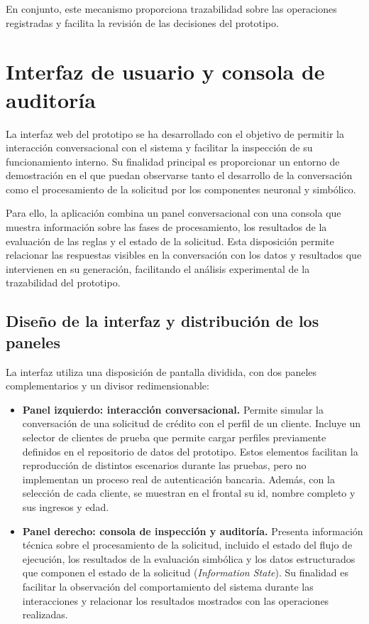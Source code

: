 \documentclass[12pt,a4paper]{report}
\begin{document}
En conjunto, este mecanismo proporciona trazabilidad sobre las operaciones registradas y facilita la revisión de las decisiones del prototipo.

\section{Interfaz de usuario y consola de auditoría}

La interfaz web del prototipo se ha desarrollado con el objetivo de permitir la interacción conversacional con el sistema y facilitar la inspección de su funcionamiento interno. Su finalidad principal es proporcionar un entorno de demostración en el que puedan observarse tanto el desarrollo de la conversación como el procesamiento de la solicitud por los componentes neuronal y simbólico.

Para ello, la aplicación combina un panel conversacional con una consola que muestra información sobre las fases de procesamiento, los resultados de la evaluación de las reglas y el estado de la solicitud. Esta disposición permite relacionar las respuestas visibles en la conversación con los datos y resultados que intervienen en su generación, facilitando el análisis experimental de la trazabilidad del prototipo.

\subsection{Diseño de la interfaz y distribución de los paneles}

La interfaz utiliza una disposición de pantalla dividida, con dos paneles complementarios y un divisor redimensionable:

\begin{itemize}
    \item \textbf{Panel izquierdo: interacción conversacional.} Permite simular la conversación de una solicitud de crédito con el perfil de un cliente. Incluye un selector de clientes de prueba que permite cargar perfiles previamente definidos en el repositorio de datos del prototipo. Estos elementos facilitan la reproducción de distintos escenarios durante las pruebas, pero no implementan un proceso real de autenticación bancaria. Además, con la selección de cada cliente, se muestran en el frontal su id, nombre completo y sus ingresos y edad.

    \item \textbf{Panel derecho: consola de inspección y auditoría.} Presenta información técnica sobre el procesamiento de la solicitud, incluido el estado del flujo de ejecución, los resultados de la evaluación simbólica y los datos estructurados que componen el estado de la solicitud (\textit{Information State}). Su finalidad es facilitar la observación del comportamiento del sistema durante las interacciones y relacionar los resultados mostrados con las operaciones realizadas.
\end{itemize}
\end{document}
